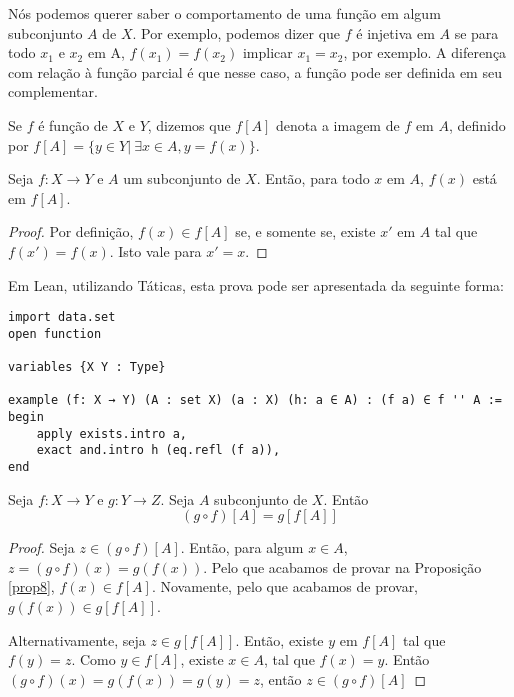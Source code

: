 Nós podemos querer saber o comportamento de uma função em algum subconjunto
$A$ de  $X$. Por exemplo, podemos dizer que $f$ é injetiva em $A$ se para todo
$x_1$ e $x_2$ em A, $f(x_1) = f(x_2) $ implicar $x_1 = x_2 $, por exemplo. A
diferença com relação à função parcial é que nesse caso, a função pode ser
definida em seu complementar. 

\begin{definition}
    \label{def8}
    Se $f$ é função de $X$ e $Y$, dizemos que $f[A]$ denota a imagem de $f$ em
    $A$, definido por $f[A] = \{y \in Y | ~\exists x \in A, y = f(x)\}$.
\end{definition}

\begin{theorem}
    \label{prop7}
    Seja $f: X \to Y $ e $A$ um subconjunto de $X$. Então, para todo $x$ em
    $A$, $f(x)$ está em $f[A]$.
\end{theorem}

\begin{proof}
    Por definição, $f(x) \in f[A] $ se, e somente se, existe $x'$ em $A$ tal
    que $f(x') = f(x)$. Isto vale para  $x' = x $.
\end{proof}

Em Lean, utilizando Táticas, esta prova pode ser apresentada da seguinte
forma: 

\begin{lstlisting}
import data.set 
open function

variables {X Y : Type}

example (f: X → Y) (A : set X) (a : X) (h: a ∈ A) : (f a) ∈ f '' A :=
begin 
    apply exists.intro a, 
    exact and.intro h (eq.refl (f a)),  
end   
\end{lstlisting}

\begin{theorem}
    \label{prop8}
    Seja $f: X \to Y$ e $g: Y \to Z$. Seja $A$ subconjunto de $X$. Então
    $$(g \circ f)[A] = g[f[A]]$$
\end{theorem}

\begin{proof}
    Seja $z \in (g \circ f)[A]$. Então, para algum $x \in A$, $z = (g \circ
    f)(x) = g(f(x))$. Pelo que acabamos de provar na Proposição \ref{prop8},
    $f(x) \in f[A]$. Novamente, pelo que acabamos de provar, $g(f(x)) \in
    g[f[A]] $.

    Alternativamente, seja $z \in g[f[A]]$. Então, existe $y$ em $f[A]$ tal
    que $f(y) = z$. Como $y \in f[A]$, existe $x \in A$, tal que $f(x) = y$.
    Então $(g \circ f)(x) = g(f(x)) = g(y) = z$, então $z \in (g \circ f)[A] $
\end{proof}

